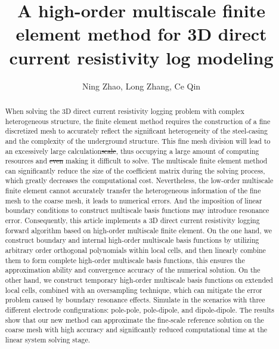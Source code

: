 \documentclass[manuscript,blind]{geophysics}
\providecommand{\DIFdel}[1]{{\protect\color{red}\sout{#1}}}                      %
\providecommand{\DIFaddbegin}{} %
\providecommand{\DIFaddend}{} %
\providecommand{\DIFdelbegin}{} %
\providecommand{\DIFdelend}{} %
\newcommand{\DIFscaledelfig}{0.5}
\newlength{\DIFdelgraphicswidth} %
\newlength{\DIFdelgraphicsheight} %
\newcommand{\DIFaddincludegraphics}[2][]{{\color{blue}\fbox{\DIFOincludegraphics[#1]{#2}}}} %
\newcommand{\DIFdelincludegraphics}[2][]{%
\sbox{\DIFdelgraphicsbox}{\DIFOincludegraphics[#1]{#2}}%
\settoboxwidth{\DIFdelgraphicswidth}{\DIFdelgraphicsbox} %
\settoboxtotalheight{\DIFdelgraphicsheight}{\DIFdelgraphicsbox} %
\scalebox{\DIFscaledelfig}{%
\parbox[b]{\DIFdelgraphicswidth}{\usebox{\DIFdelgraphicsbox}\\[-\baselineskip] \rule{\DIFdelgraphicswidth}{0em}}\llap{\resizebox{\DIFdelgraphicswidth}{\DIFdelgraphicsheight}{%
\setlength{\unitlength}{\DIFdelgraphicswidth}%
\begin{picture}(1,1)%
\thicklines\linethickness{2pt} %
{\color[rgb]{1,0,0}\put(0,0){\framebox(1,1){}}}%
{\color[rgb]{1,0,0}\put(0,0){\line( 1,1){1}}}%
{\color[rgb]{1,0,0}\put(0,1){\line(1,-1){1}}}%
\end{picture}%
}\hspace*{3pt}}} %
} %
\DeclareRobustCommand{\DIFaddbegin}{\DIFOaddbegin \let\includegraphics\DIFaddincludegraphics} %
\DeclareRobustCommand{\DIFaddend}{\DIFOaddend \let\includegraphics\DIFOincludegraphics} %
\DeclareRobustCommand{\DIFdelbegin}{\DIFOdelbegin \let\includegraphics\DIFdelincludegraphics} %
\DeclareRobustCommand{\DIFdelend}{\DIFOaddend \let\includegraphics\DIFOincludegraphics} %
\begin{document}
\title{A high-order multiscale finite element method for 3D direct current resistivity log modeling}

\address{
\footnotemark[1]School of Physics and Electronic Information Engineering, Henan Polytechnic University, Jiaozuo, 454000,
\footnotemark[2]School of Mathematics and Information Science, Henan Polytechnic University, Jiaozuo, 454000, China
}

\author{Ning Zhao\footnotemark[1] , Long Zhang\footnotemark[2] , Ce Qin\footnotemark[1]}

\DIFdelbegin %
\DIFdelend \DIFaddbegin {}
\DIFaddend 

\maketitle

\begin{abstract}
When solving the 3D direct current resistivity logging problem with complex heterogeneous structure, the finite element method requires the construction of a fine discretized mesh to accurately reflect the significant heterogeneity of the steel-casing and the complexity of the underground structure. This fine mesh division will lead to an excessively large calculation\DIFdelbegin \DIFdel{scale}\DIFdelend , thus occupying a large amount of computing resources and \DIFdelbegin \DIFdel{even }\DIFdelend making it difficult to solve. The multiscale finite element method can significantly reduce the size of the coefficient matrix during the solving process, which greatly decreases the computational cost. Nevertheless, the low-order multiscale finite element cannot accurately transfer the heterogeneous information of the fine mesh to the coarse mesh, it leads to numerical errors. And the imposition of linear boundary conditions to construct multiscale basis functions may introduce resonance error. Consequently, this article implements a 3D direct current resistivity logging forward algorithm based on high-order multiscale finite element. On the one hand, we construct boundary and internal high-order multiscale basis functions by utilizing arbitrary order orthogonal polynomials within local cells, and then linearly combine them to form complete high-order multiscale basis functions, this ensures the approximation ability and convergence accuracy of the numerical solution. On the other hand, we construct temporary high-order multiscale basis functions on extended local cells, combined with an oversampling technique, which can mitigate the error problem caused by boundary resonance effects. Simulate in the scenarios with three different electrode configurations: pole-pole, pole-dipole, and dipole-dipole. The results show that our new method can approximate the fine-scale reference solution on the coarse mesh with high accuracy and significantly reduced computational time at the linear system solving stage.
\end{abstract}
\end{document}
